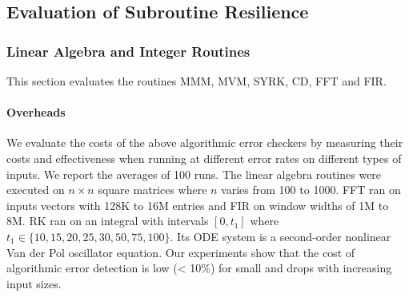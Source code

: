 \documentclass{sig-alternate}
\begin{document}
\subsection{Evaluation of Subroutine Resilience}
\label{sec:res_tech:eval}



\subsubsection{Linear Algebra and Integer Routines}
\label{sec:res_tech:eval:la_int}

This section evaluates the routines MMM, MVM, SYRK, CD, FFT and FIR.

\paragraph{Overheads}


We evaluate the costs of the above algorithmic error checkers by measuring their costs and effectiveness when running at different error rates on different types of inputs.
We report the averages of 100 runs.
The linear algebra routines were executed on $n \times n$ square matrices where $n$ varies from 100 to 1000.
FFT ran on inputs vectors with 128K to 16M entries and FIR on window widths of 1M to 8M.
RK ran on an integral with intervals $[0, t_1]$ where $t_1 \in \{10, 15, 20, 25, 30, 50, 75, 100\}$. 
Its ODE system is a second-order nonlinear Van der Pol oscillator equation.
Our experiments show that the cost of algorithmic error detection is low (< 10\%) for small and drops with increasing input sizes.
\end{document}
